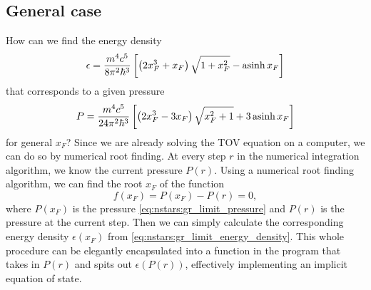 \subsection{General case}

How can we find the energy density
\begin{equation}
	\epsilon = \frac{m^4 c^5}{8 \pi^2 \hbar^3} \left[ \left( 2 x_F^3 + x_F \right) \sqrt{1 + x_F^2} - \operatorname{asinh} x_F \right]
\label{eq:nstars:gr_limit_energy_density}
\end{equation}
that corresponds to a given pressure
\begin{equation}
	P = \frac{m^4 c^5}{24 \pi^2 \hbar^3} \left[ \left( 2 x_F^3 - 3 x_F \right) \sqrt{x_F^2 + 1} + 3 \operatorname{asinh} x_F \right] 
\label{eq:nstars:gr_limit_pressure}
\end{equation}
for general $x_F$?
Since we are already solving the TOV equation on a computer, we can do so by numerical root finding.
At every step $r$ in the numerical integration algorithm, we know the current pressure $P(r)$.
Using a numerical root finding algorithm, we can find the root $x_F$ of the function
\begin{equation}
	f(x_F) = P(x_F) - P(r) = 0,
\end{equation}
where $P(x_F)$ is the pressure \eqref{eq:nstars:gr_limit_pressure} and $P(r)$ is the pressure at the current step.
Then we can simply calculate the corresponding energy density $\epsilon(x_F)$ from \cref{eq:nstars:gr_limit_energy_density}.
This whole procedure can be elegantly encapsulated into a function in the program that takes in $P(r)$ and spits out $\epsilon(P(r))$, effectively implementing an implicit equation of state.

\iffalse
\begin{equation}
	\diml{P}(x_F) = \frac{m^4 c^3 r_0^3}{18 \pi m_0 \hbar^3} \left[ (2 x_F^3 - 3 x_F) \sqrt{x_F^2 + 1} + 3 \asinh x_F \right]
\end{equation}

At every integration step, we have a value of the pressure $P$.
Then find the root $x_F$ of
\begin{equation}
	P(x_F) - P = 0
\end{equation}
and then calculate
\begin{equation}
	\diml{ϵ} = \diml{ϵ}(x_F) = \diml{P}(x_F) = \frac{m^4 c^3 r_0^3}{6 \pi m_0 \hbar^3} \left[ (2 x_F^3 + x_F) \sqrt{x_F^2 + 1} - \asinh x_F \right]
\end{equation}
\fi


